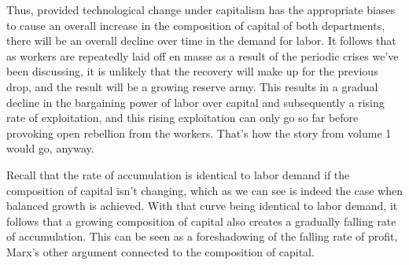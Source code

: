 \documentclass{article}
\theoremstyle{theorem}
\begin{document}
Thus, provided technological change under capitalism has the appropriate biases to cause an overall increase in the composition of capital of both departments, there will be an overall decline over time in the demand for labor. It follows that as workers are repeatedly laid off en masse as a result of the periodic crises we've been discussing, it is unlikely that the recovery will make up for the previous drop, and the result will be a growing reserve army. This results in a gradual decline in the bargaining power of labor over capital and subsequently a rising rate of exploitation, and this rising exploitation can only go so far before provoking open rebellion from the workers. That's how the story from volume 1 would go, anyway. \par 
Recall that the rate of accumulation is identical to labor demand if the composition of capital isn't changing, which as we can see is indeed the case when balanced growth is achieved. With that curve being identical to labor demand, it follows that a growing composition of capital also creates a gradually falling rate of accumulation. This can be seen as a foreshadowing of the falling rate of profit, Marx's other argument connected to the composition of capital. 
\end{document}
